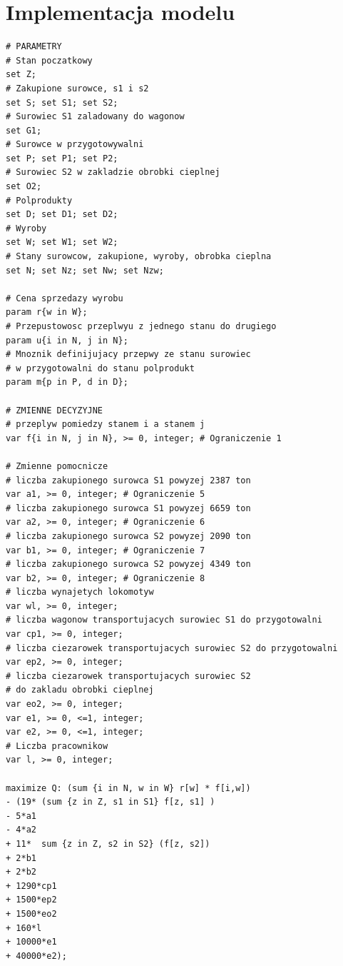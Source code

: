 \section{Implementacja modelu}
\begin{lstlisting}[caption= plik mod]
# PARAMETRY
# Stan poczatkowy
set Z;
# Zakupione surowce, s1 i s2
set S; set S1; set S2;
# Surowiec S1 zaladowany do wagonow
set G1;
# Surowce w przygotowywalni
set P; set P1; set P2;
# Surowiec S2 w zakladzie obrobki cieplnej
set O2;
# Polprodukty 
set D; set D1; set D2;
# Wyroby
set W; set W1; set W2;
# Stany surowcow, zakupione, wyroby, obrobka cieplna
set N; set Nz; set Nw; set Nzw;

# Cena sprzedazy wyrobu
param r{w in W};
# Przepustowosc przeplwyu z jednego stanu do drugiego
param u{i in N, j in N};
# Mnoznik definijujacy przepwy ze stanu surowiec
# w przygotowalni do stanu polprodukt
param m{p in P, d in D};

# ZMIENNE DECYZYJNE
# przeplyw pomiedzy stanem i a stanem j
var f{i in N, j in N}, >= 0, integer; # Ograniczenie 1

# Zmienne pomocnicze
# liczba zakupionego surowca S1 powyzej 2387 ton
var a1, >= 0, integer; # Ograniczenie 5
# liczba zakupionego surowca S1 powyzej 6659 ton
var a2, >= 0, integer; # Ograniczenie 6
# liczba zakupionego surowca S2 powyzej 2090 ton
var b1, >= 0, integer; # Ograniczenie 7
# liczba zakupionego surowca S2 powyzej 4349 ton
var b2, >= 0, integer; # Ograniczenie 8
# liczba wynajetych lokomotyw
var wl, >= 0, integer;
# liczba wagonow transportujacych surowiec S1 do przygotowalni
var cp1, >= 0, integer;
# liczba ciezarowek transportujacych surowiec S2 do przygotowalni
var ep2, >= 0, integer; 
# liczba ciezarowek transportujacych surowiec S2
# do zakladu obrobki cieplnej
var eo2, >= 0, integer;
var e1, >= 0, <=1, integer;
var e2, >= 0, <=1, integer;
# Liczba pracownikow
var l, >= 0, integer;

maximize Q: (sum {i in N, w in W} r[w] * f[i,w])
- (19* (sum {z in Z, s1 in S1} f[z, s1] )
- 5*a1 
- 4*a2 
+ 11*  sum {z in Z, s2 in S2} (f[z, s2])
+ 2*b1 
+ 2*b2
+ 1290*cp1
+ 1500*ep2 
+ 1500*eo2 
+ 160*l 
+ 10000*e1 
+ 40000*e2);


\end{lstlisting}
